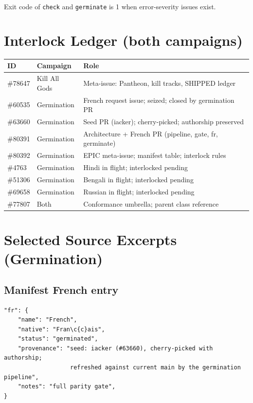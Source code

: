 \documentclass[11pt]{article}
\theoremstyle{definition}
\theoremstyle{plain}
\theoremstyle{remark}
\begin{document}
Exit code of \texttt{check} and \texttt{germinate} is 1 when error-severity
issues exist.

\section{Interlock Ledger (both campaigns)}
\label{app:interlock}

\begin{center}
\begin{tabular}{@{}llp{}@{}}
\toprule
ID & Campaign & Role \\
\midrule
\#78647 & Kill All Gods & Meta-issue: Pantheon, kill tracks, SHIPPED ledger \\
\#60535 & Germination & French request issue; seized; closed by germination PR \\
\#63660 & Germination & Seed PR (iacker); cherry-picked; authorship preserved \\
\#80391 & Germination & Architecture + French PR (pipeline, gate, fr, germinate) \\
\#80392 & Germination & EPIC meta-issue; manifest table; interlock rules \\
\#4763 & Germination & Hindi in flight; interlocked pending \\
\#51306 & Germination & Bengali in flight; interlocked pending \\
\#69658 & Germination & Russian in flight; interlocked pending \\
\#77807 & Both & Conformance umbrella; parent class reference \\
\bottomrule
\end{tabular}
\end{center}

\section{Selected Source Excerpts (Germination)}
\label{app:source}

\subsection{Manifest French entry}

\begin{verbatim}
"fr": {
    "name": "French",
    "native": "Fran\c{c}ais",
    "status": "germinated",
    "provenance": "seed: iacker (#63660), cherry-picked with authorship;
                   refreshed against current main by the germination pipeline",
    "notes": "full parity gate",
}
\end{verbatim}
\end{document}
